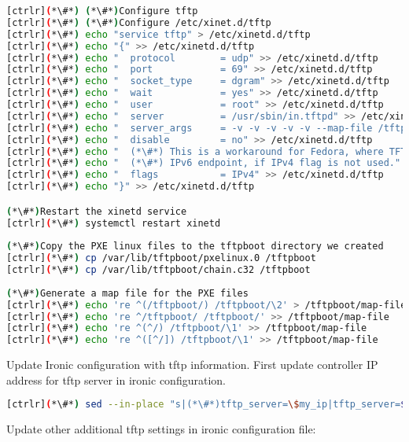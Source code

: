 \begin{lstlisting}[language=bash,keywords={}]
[ctrlr](*\#*) (*\#*)Configure tftp 
[ctrlr](*\#*) (*\#*)Configure /etc/xinet.d/tftp
[ctrlr](*\#*) echo "service tftp" > /etc/xinetd.d/tftp
[ctrlr](*\#*) echo "{" >> /etc/xinetd.d/tftp
[ctrlr](*\#*) echo "  protocol        = udp" >> /etc/xinetd.d/tftp
[ctrlr](*\#*) echo "  port            = 69" >> /etc/xinetd.d/tftp
[ctrlr](*\#*) echo "  socket_type     = dgram" >> /etc/xinetd.d/tftp
[ctrlr](*\#*) echo "  wait            = yes" >> /etc/xinetd.d/tftp
[ctrlr](*\#*) echo "  user            = root" >> /etc/xinetd.d/tftp
[ctrlr](*\#*) echo "  server          = /usr/sbin/in.tftpd" >> /etc/xinetd.d/tftp
[ctrlr](*\#*) echo "  server_args     = -v -v -v -v -v --map-file /tftpboot/map-file /tftpboot" >> /etc/xinetd.d/tftp
[ctrlr](*\#*) echo "  disable         = no" >> /etc/xinetd.d/tftp
[ctrlr](*\#*) echo "  (*\#*) This is a workaround for Fedora, where TFTP will listen only on" >> /etc/xinetd.d/tftp
[ctrlr](*\#*) echo "  (*\#*) IPv6 endpoint, if IPv4 flag is not used." >> /etc/xinetd.d/tftp
[ctrlr](*\#*) echo "  flags           = IPv4" >> /etc/xinetd.d/tftp
[ctrlr](*\#*) echo "}" >> /etc/xinetd.d/tftp

(*\#*)Restart the xinetd service
[ctrlr](*\#*) systemctl restart xinetd
    
(*\#*)Copy the PXE linux files to the tftpboot directory we created
[ctrlr](*\#*) cp /var/lib/tftpboot/pxelinux.0 /tftpboot
[ctrlr](*\#*) cp /var/lib/tftpboot/chain.c32 /tftpboot
    
(*\#*)Generate a map file for the PXE files
[ctrlr](*\#*) echo 're ^(/tftpboot/) /tftpboot/\2' > /tftpboot/map-file
[ctrlr](*\#*) echo 're ^/tftpboot/ /tftpboot/' >> /tftpboot/map-file
[ctrlr](*\#*) echo 're ^(^/) /tftpboot/\1' >> /tftpboot/map-file
[ctrlr](*\#*) echo 're ^([^/]) /tftpboot/\1' >> /tftpboot/map-file
\end{lstlisting} 


Update Ironic configuration with tftp information. First update controller IP address for tftp server in ironic configuration.


\begin{lstlisting}[language=bash,keywords={}]
[ctrlr](*\#*) sed --in-place "s|(*\#*)tftp_server=\$my_ip|tftp_server=${controller_ip}|" /etc/ironic/ironic.conf
\end{lstlisting} 

Update other additional tftp settings in ironic configuration file:

